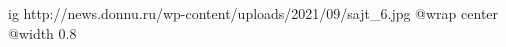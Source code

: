  
 
 
 
 

\ifcmt
  ig http://news.donnu.ru/wp-content/uploads/2021/09/sajt_6.jpg
	@wrap center
	@width 0.8
\fi
